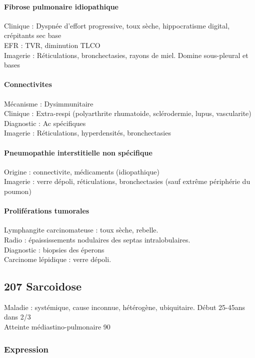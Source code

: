 \documentclass[11pt]{article}
\begin{document}
\paragraph{Fibrose pulmonaire idiopathique}
\label{sec:orgc30728c}
Clinique : Dyspnée d'effort progressive, toux sèche, hippocratisme digital, crépitants sec base\\
EFR : TVR, diminution TLCO\\
Imagerie : Réticulations, bronchectasies, rayons de miel. Domine sous-pleural et bases

\paragraph{Connectivites}
\label{sec:org7cbf1e0}
Mécanisme : Dysimmunitaire\\
Clinique : Extra-respi (polyarthrite rhumatoide, sclérodermie, lupus, vascularite)\\
Diagnostic : Ac spécifiques\\
Imagerie : Réticulations, hyperdensités, bronchectasies

\paragraph{Pneumopathie interstitielle non spécifique}
\label{sec:org97a9db8}
Origine : connectivite, médicaments (idiopathique)\\
Imagerie : verre dépoli, réticulations, bronchectasies (sauf extrême périphérie du poumon)

\paragraph{Proliférations tumorales}
\label{sec:org72e1cd5}
Lymphangite carcinomateuse : toux sèche, rebelle. \\
Radio : épaississements nodulaires des septas intralobulaires.\\
Diagnostic : biopsies des éperons\\
Carcinome lépidique : verre dépoli. 

\subsection{207 \textdagger{} Sarcoidose}
\label{sec:orge7c5fe1}
Maladie : systémique, cause inconnue, hétérogène, ubiquitaire. Début 25-45ans
dans 2/3\\
Atteinte médiastino-pulmonaire 90

\subsubsection{Expression}
\label{sec:orgfcd51f9}
\label{sec:org39048da}
\end{document}
